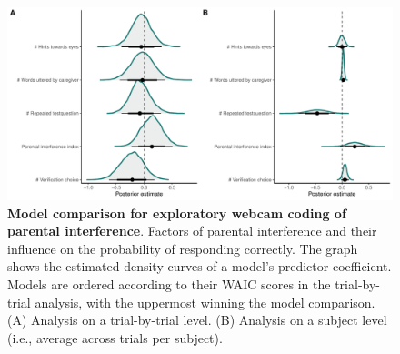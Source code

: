 \documentclass[
  man,floatsintext]{apa6}
\begin{document}
\begin{figure}

{\centering \includegraphics[width=1\linewidth]{../figures/tango_supplements_webcamcoding} 

}

\caption{\textbf{Model comparison for exploratory webcam coding of parental interference}. Factors of parental interference and their influence on the probability of responding correctly. The graph shows the estimated density curves of a model's predictor coefficient. Models are ordered according to their WAIC scores in the trial-by-trial analysis, with the uppermost winning the model comparison. (A) Analysis on a trial-by-trial level. (B) Analysis on a subject level (i.e., average across trials per subject).}\label{fig:fig3}
\end{figure}
\end{document}
